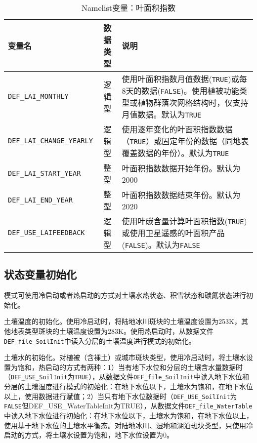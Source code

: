\begin{table}[!htbp] \small
\caption{Namelist变量：叶面积指数}
\label{table_nl_lai}
\centering \renewcommand{\arraystretch}{1.5}
\begin{tabular}{lcp{}}
\toprule
\textbf{变量名} & \textbf{数据类型} & \textbf{说明} \\\midrule
\texttt{DEF\_LAI\_MONTHLY} & 逻辑型 & 使用叶面积指数月值数据(\texttt{TRUE})或每8天的数据(\texttt{FALSE})。使用植被功能类型或植物群落次网格结构时，仅支持月值数据。默认为\texttt{TRUE}\\
\texttt{DEF\_LAI\_CHANGE\_YEARLY}  & 逻辑型 & 使用逐年变化的叶面积指数数据（\texttt{TRUE}）或固定年份的数据（同地表覆盖数据的年份）。默认为\texttt{TRUE} \\
\texttt{DEF\_LAI\_START\_YEAR} & 整型 & 叶面积指数数据开始年份。默认为2000\\
\texttt{DEF\_LAI\_END\_YEAR} & 整型 & 叶面积指数数据结束年份。默认为2020\\
\texttt{DEF\_USE\_LAIFEEDBACK} & 逻辑型 & 使用叶碳含量计算叶面积指数(\texttt{TRUE})或使用卫星遥感的叶面积产品(\texttt{FALSE})。默认为\texttt{FALSE} \\
\bottomrule
\end{tabular}
\end{table}


\subsection{状态变量初始化}

模式可使用冷启动或者热启动的方式对土壤水热状态、积雪状态和碳氮状态进行初始化。

土壤温度的初始化。使用冷启动时，将陆地冰川斑块的土壤温度设置为253K，其他地表类型斑块的土壤温度设置为283K。使用热启动时，从数据文件\texttt{DEF\_file\_SoilInit}中读入分层的土壤温度进行模式的初始化。

土壤水的初始化。对植被（含裸土）或城市斑块类型，使用冷启动时，将土壤水设置为饱和，热启动的方式有两种：1）当有地下水位和分层的土壤含水量数据时（\texttt{DEF\_USE\_SoilInit}为\texttt{TRUE}），从数据文件\texttt{DEF\_file\_SoilInit}中读入地下水位和分层的土壤湿度进行模式的初始化：在地下水位以下，土壤水为饱和，在地下水位以上，使用数据进行赋值；2）当只有地下水位数据时（\texttt{DEF\_USE\_SoilInit}为\texttt{FALSE}但DEF\_USE\_WaterTableInit为TRUE），从数据文件\texttt{DEF\_file\_WaterTable}中读入地下水位进行初始化：在地下水位以下，土壤水为饱和，在地下水位以上，使用基于地下水位的土壤水平衡态。对陆地冰川、湿地和湖泊斑块类型，只使用冷启动的方式，将土壤水设置为饱和，地下水位设置为0。

